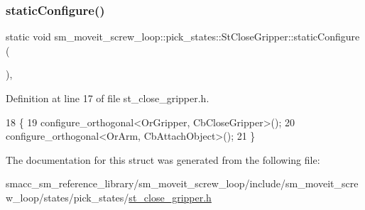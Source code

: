 \subsubsection{\texorpdfstring{static\+Configure()}{staticConfigure()}}
{\footnotesize\ttfamily static void sm\+\_\+moveit\+\_\+screw\+\_\+loop\+::pick\+\_\+states\+::\+St\+Close\+Gripper\+::static\+Configure (\begin{DoxyParamCaption}{ }\end{DoxyParamCaption})\hspace{0.3cm}{\ttfamily [inline]}, {\ttfamily [static]}}



Definition at line 17 of file st\+\_\+close\+\_\+gripper.\+h.


\begin{DoxyCode}
18          \{
19             configure\_orthogonal<OrGripper, CbCloseGripper>();
20             configure\_orthogonal<OrArm, CbAttachObject>();
21          \}
\end{DoxyCode}


The documentation for this struct was generated from the following file\+:\begin{DoxyCompactItemize}
\item 
smacc\+\_\+sm\+\_\+reference\+\_\+library/sm\+\_\+moveit\+\_\+screw\+\_\+loop/include/sm\+\_\+moveit\+\_\+screw\+\_\+loop/states/pick\+\_\+states/\hyperlink{sm__moveit__screw__loop_2include_2sm__moveit__screw__loop_2states_2pick__states_2st__close__gripper_8h}{st\+\_\+close\+\_\+gripper.\+h}\end{DoxyCompactItemize}
